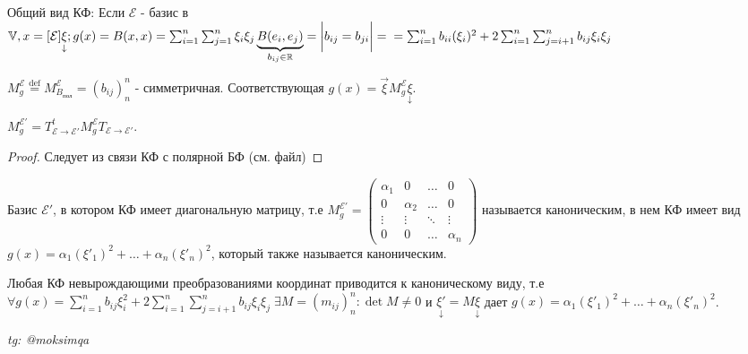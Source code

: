 \documentclass[../main.tex]{subfiles}
\begin{document}
Общий вид КФ: 
\noindent Если $\mathcal{E}$ - базис в $\mathbb{V},  x = [\mathcal{E}]\underset{\downarrow}{\xi}; g(x) = B(x,x) = \sum_{i=1}^{n} \sum_{j=1}^{n} \xi_{i}\xi_{j}\underbrace{B(e_{i},e_{j})}_{b_{ij}\in\mathbb{R}} =\bigg| b_{ij} = b_{ji} \bigg| = \\ = \sum_{i=1}^{n} b_{ii}(\xi_{i})^{2} + 2 \sum_{i    =1}^{n}\sum_{j=i+1}^{n} b_{ij} \xi_{i}\xi_{j}$
\begin{definition}
    $M_{g}^{\mathcal{E}}  \overset{\text{def}}{=} M_{B_{\text{пол}}}^{\mathcal{E}} = (b_{ij})^{n}_{n}$ - симметричная. Соответствующая $g(x) = \vec{\xi} M_{g}^{\mathcal{E}} \underset{\downarrow}{\xi}$.
\end{definition}
\begin{theorem}
    $M_{g}^{\mathcal{E'}} = T_{\mathcal{E}\to\mathcal{E'}}^{t} M_{g}^{\mathcal{E}} T_{\mathcal{E}\to\mathcal{E'}}$.
\end{theorem}
\begin{proof}
    Следует из связи КФ с полярной БФ (см. файл)
\end{proof}

\begin{definition}
    Базис $\mathcal{E'}$, в котором КФ имеет диагональную матрицу, т.е $M_{g}^{\mathcal{E'}} = \begin{pmatrix}
        \alpha_{1} & 0 & \dots & 0 \\
        0 & \alpha_{2} & \dots & 0 \\
        \vdots & \vdots & \ddots & \vdots \\
        0 & 0 & \dots & \alpha_{n}
        \end{pmatrix} $ называется каноническим, в нем КФ имеет вид $g(x) = \alpha_{1}( \xi'_{1})^{2} + \dots + \alpha_{n}(\xi'_{n})^{2}$, который также называется каноническим. 
\end{definition}
\newpage
\begin{theorem}[Лагранжа]
    Любая КФ невырождающими преобразованиями координат приводится к каноническому виду, т.е $\forall g(x) = \sum_{i =1}^{n  } b_{ij} \xi_{i}^{2} + 2 \sum_{i=1}^{n} \sum_{j=i+1}^{n} b_{ij} \xi_{i}\xi_{j} \; \exists M = (m_{ij})^{n}_{n} : \det{M}\neq  0 $ и $\underset{\downarrow}{\xi'} = M\underset{\downarrow}{\xi}$ дает $g(x) = \alpha_{1}(\xi'_{1})^{2} + \dots + \alpha_{n}(\xi'_{n})^{2}$.
\end{theorem}




\vspace{1cm}
\begin{flushright}
    \textit{tg: @moksimqa}
\end{flushright}
\end{document}
